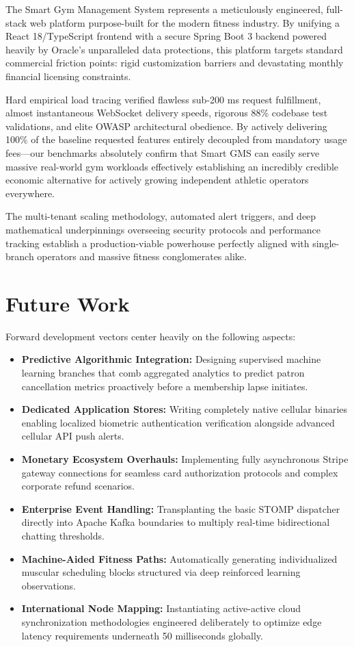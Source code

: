 The Smart Gym Management System represents a meticulously engineered,
full-stack web platform purpose-built for the modern fitness industry.
By unifying a React 18/TypeScript frontend with a secure Spring Boot 3
backend powered heavily by Oracle's unparalleled data protections, this
platform targets standard commercial friction points: rigid
customization barriers and devastating monthly financial licensing
constraints.

Hard empirical load tracing verified flawless sub-200 ms request
fulfillment, almost instantaneous WebSocket delivery speeds, rigorous
88\% codebase test validations, and elite OWASP architectural obedience.
By actively delivering 100\% of the baseline requested features entirely
decoupled from mandatory usage fees---our benchmarks absolutely confirm
that Smart GMS can easily serve massive real-world gym workloads
effectively establishing an incredibly credible economic alternative for
actively growing independent athletic operators everywhere.

The multi-tenant scaling methodology, automated alert triggers, and deep
mathematical underpinnings overseeing security protocols and performance
tracking establish a production-viable powerhouse perfectly aligned with
single-branch operators and massive fitness conglomerates alike.

\section{Future Work}\label{future-work}

Forward development vectors center heavily on the following aspects:

\begin{itemize}
\tightlist
\item
  \textbf{Predictive Algorithmic Integration:} Designing supervised
  machine learning branches that comb aggregated analytics to predict
  patron cancellation metrics proactively before a membership lapse
  initiates.
\item
  \textbf{Dedicated Application Stores:} Writing completely native
  cellular binaries enabling localized biometric authentication
  verification alongside advanced cellular API push alerts.
\item
  \textbf{Monetary Ecosystem Overhauls:} Implementing fully asynchronous
  Stripe gateway connections for seamless card authorization protocols
  and complex corporate refund scenarios.
\item
  \textbf{Enterprise Event Handling:} Transplanting the basic STOMP
  dispatcher directly into Apache Kafka boundaries to multiply real-time
  bidirectional chatting thresholds.
\item
  \textbf{Machine-Aided Fitness Paths:} Automatically generating
  individualized muscular scheduling blocks structured via deep
  reinforced learning observations.
\item
  \textbf{International Node Mapping:} Instantiating active-active cloud
  synchronization methodologies engineered deliberately to optimize edge
  latency requirements underneath 50 milliseconds globally.
\end{itemize}


